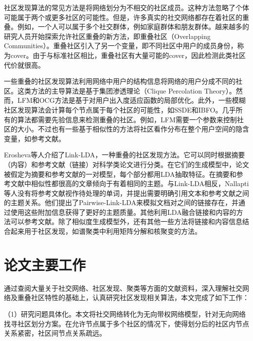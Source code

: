 
社区发现算法的常见方法是将网络划分为不相交的社区成员。这种方法忽略了个体可能属于两个或更多社区的可能性。但是，许多真实的社交网络都存在着社区的重叠\cite{Xie2013Overlapping}。例如，一个人可以属于多个社交群体，例如家庭群体和朋友群体。越来越多的研究人员开始探索允许社区重叠的新方法，即重叠社区（Overlapping Communities）。重叠社区引入了另一个变量，即不同社区中用户的成员身份，称为cover。由于与标准社区相比，重叠社区有大量可能的cover，因此检测此类社区代价就很高。

一些重叠的社区发现算法利用网络中用户的结构信息将网络的用户分成不同的社区。这类方法的主导算法是基于集团渗透理论（Clique Percolation Theory）\cite{Palla2005Uncovering}。然而，LFM和OCG方法是基于对用户出入度适应函数的局部优化\cite{Lancichinetti2012Detecting,Becker2012Multifunctional}。此外，一些模糊社区发现算法会计算每个节点属于每个社区的可能性，如SSDE和IBFO\cite{Magdon2010SSDE,Lei2013Clustering}。几乎所有的算法都需要先验信息来检测重叠的社区。例如，LFM需要一个参数来控制社区的大小。不过也有一些基于相似性的方法将社区看作分布在整个用户空间的隐含变量，如参考文献\cite{Ren2007A}。

Erosheva等人\cite{Erosheva2004Mixed}介绍了Link-LDA，一种重叠的社区发现方法。它可以同时根据摘要（内容）和参考文献（链接）对科学类论文进行分类。在它们的生成模型中，论文被假定为摘要和参考文献的一对模型，每个部分都用LDA抽取特征。在摘要和参考文献中相似性都很高的文章倾向于有着相同的主题。与Link-LDA相反，Nallapti等人\cite{Nallapati2008Joint}没有将参考文献视作待处理的单词，并提出需要明确引用文本和参考文献之间的主题关系。他们提出了Pairwise-Link-LDA来模拟文档对之间的链接存在，并通过使用这些附加信息获得了更好的主题质量。其他利用LDA融合链接和内容的方法可以参考文献\cite{Dietz2007Unsupervised,Gruber2008Latent}。除了相似度生成模型外，还有其他一些方法将链接和内容信息结合起来用于社区发现，如谱聚类中利用矩阵分解和核聚变的方法\cite{Zhu2007Combining,Yu2008Clustering}。

\section{论文主要工作}

通过查阅大量关于社交网络、社区发现、聚类等方面的文献资料，深入理解社交网络及重叠社区特性的基础上，认真研究社区发现相关算法，本文完成了如下工作：

（1）研究问题具体化。本文将社交网络转化为无向带权网络模型，针对无向网络找寻社区划分方案。在允许节点属于多个社区的情况下，使得划分后的社区内节点关系紧密，社区间节点关系疏远。

